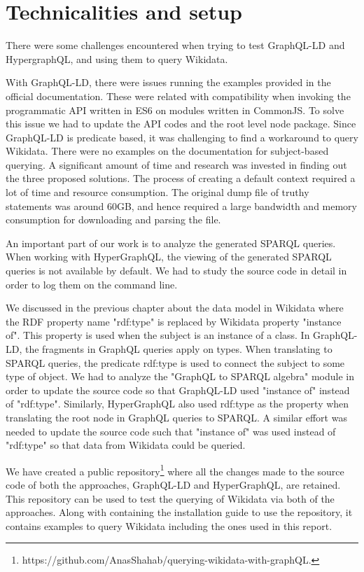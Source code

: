 \section{Technicalities and setup}
There were some challenges encountered when trying to test GraphQL-LD and HypergraphQL, and using them to query Wikidata. 

With GraphQL-LD, there were issues running the examples provided in the official documentation. These were related with compatibility when invoking the programmatic API written in ES6 on modules written in CommonJS. To solve this issue we had to update the API codes and the root level node package. Since GraphQL-LD is predicate based, it was challenging to find a workaround to query Wikidata. There were no examples on the documentation for subject-based querying. A significant amount of time and research was invested in finding out the three proposed solutions. The process of creating a default context required a lot of time and resource consumption. The original dump file of truthy statements was around 60GB, and hence required a large bandwidth and memory consumption for downloading and parsing the file. 

An important part of our work is to analyze the generated SPARQL queries. When working with HyperGraphQL, the viewing of the generated SPARQL queries is not available by default. We had to study the source code in detail in order to log them on the command line. 

We discussed in the previous chapter about the data model in Wikidata where the RDF property name "rdf:type" is replaced by Wikidata property "instance of". This property is used when the subject is an instance of a class. In GraphQL-LD, the fragments in GraphQL queries apply on types. When translating to SPARQL queries, the predicate rdf:type is used to connect the subject to some type of object. We had to analyze the "GraphQL to SPARQL algebra" module in order to update the source code so that GraphQL-LD used "instance of" instead of "rdf:type". Similarly, HyperGraphQL also used rdf:type as the property when translating the root node in GraphQL queries to SPARQL. A similar effort was needed to update the source code such that "instance of" was used instead of "rdf:type" so that data from Wikidata could be queried.

We have created a public repository\footnote{https://github.com/AnasShahab/querying-wikidata-with-graphQL.} where all the changes made to the source code of both the approaches, GraphQL-LD and HyperGraphQL, are retained. This repository can be used to test the querying of Wikidata via both of the approaches. Along with containing the installation guide to use the repository, it contains examples to query Wikidata including the ones used in this report.
